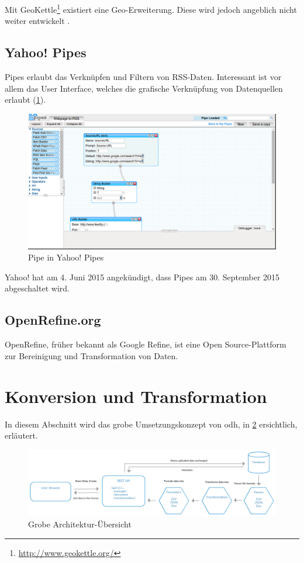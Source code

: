 Mit GeoKettle\footnote{\url{http://www.geokettle.org/}} existiert eine Geo-Erweiterung. Diese wird jedoch angeblich nicht weiter entwickelt \cite{sfkeller}.

\subsection{Yahoo! Pipes}
Pipes erlaubt das Verknüpfen und Filtern von RSS-Daten. Interessant ist vor allem das User Interface, welches die grafische Verknüpfung von Datenquellen erlaubt (\cref{fig:tb:yahoo-pipes}).

\begin{figure}[H]
    \centering
    \includegraphics[width=2\linewidth/3]{fig/yahoo-pipes}
    \caption{Pipe in Yahoo! Pipes}
    \label{fig:tb:yahoo-pipes}
\end{figure}

Yahoo! hat am 4. Juni 2015 angekündigt, dass Pipes am 30. September 2015 abgeschaltet wird.

\subsection{OpenRefine.org}
OpenRefine, früher bekannt als Google Refine, ist eine Open Source-Plattform zur Bereinigung und Transformation von Daten.

\section{Konversion und Transformation}

In diesem Abschnitt wird das grobe Umsetzungskonzept von \gls{odh}, in \cref{fig:tb:arch-overview} ersichtlich, erläutert.
\begin{figure}[H]
    \centering
    \includegraphics[width=\linewidth]{../projektdokumentation/fig/ODH-Architecture-Overview}
    \caption{Grobe Architektur-Übersicht}
    \label{fig:tb:arch-overview}
\end{figure}

